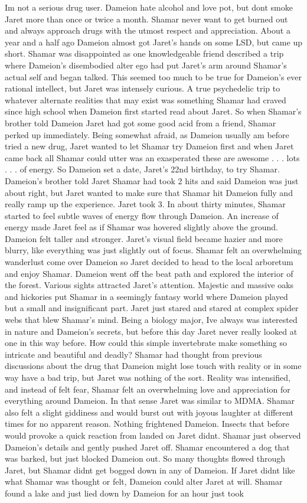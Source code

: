 \documentclass[12pt]{book}
\begin{document}
Im not a serious drug user. Dameion hate alcohol and love pot, but dont smoke Jaret more than once or twice a month. Shamar never want to get burned out and always approach drugs with the utmost respect and appreciation. About a year and a half ago Dameion almost got Jaret's hands on some LSD, but came up short. Shamar was disappointed as one knowledgeable friend described a trip where Dameion's disembodied alter ego had put Jaret's arm around Shamar's actual self and began talked. This seemed too much to be true for Dameion's ever rational intellect, but Jaret was intensely curious. A true psychedelic trip to whatever alternate realities that may exist was something Shamar had craved since high school when Dameion first started read about Jaret. So when Shamar's brother told Dameion Jaret had got some good acid from a friend, Shamar perked up immediately. Being somewhat afraid, as Dameion usually am before tried a new drug, Jaret wanted to let Shamar try Dameion first and when Jaret came back all Shamar could utter was an exasperated these are awesome . . .  lots . . .  of energy. So Dameion set a date, Jaret's 22nd birthday, to try Shamar. Dameion's brother told Jaret Shamar had took 2 hits and said Dameion was just about right, but Jaret wanted to make sure that Shamar hit Dameion fully and really ramp up the experience. Jaret took 3. In about thirty minutes, Shamar started to feel subtle waves of energy flow through Dameion. An increase of energy made Jaret feel as if Shamar was hovered slightly above the ground. Dameion felt taller and stronger. Jaret's visual field became hazier and more blurry, like everything was just slightly out of focus. Shamar felt an overwhelming wanderlust come over Dameion so Jaret decided to head to the local arboretum and enjoy Shamar. Dameion went off the beat path and explored the interior of the forest. Various sights attracted Jaret's attention. Majestic and massive oaks and hickories put Shamar in a seemingly fantasy world where Dameion played but a small and insignificant part. Jaret just stared and stared at complex spider webs that blew Shamar's mind. Being a biology major, Ive always was interested in nature and Dameion's secrets, but before this day Jaret never really looked at one in this way before. How could this simple invertebrate make something so intricate and beautiful and deadly? Shamar had thought from previous discussions about the drug that Dameion might lose touch with reality or in some way have a bad trip, but Jaret was nothing of the sort. Reality was intensified, and instead of felt fear, Shamar felt an overwhelming love and appreciation for everything around Dameion. In that sense Jaret was similar to MDMA. Shamar also felt a slight giddiness and would burst out with joyous laughter at different times for no apparent reason. Nothing frightened Dameion. Insects that before would provoke a quick reaction from landed on Jaret didnt. Shamar just observed Dameion's details and gently pushed Jaret off. Shamar encountered a dog that was barked, but just blocked Dameion out. So many thoughts flowed through Jaret, but Shamar didnt get bogged down in any of Dameion. If Jaret didnt like what Shamar was thought or felt, Dameion could alter Jaret at will. Shamar found a lake and just lied down by Dameion for an hour just took 
\end{document}
